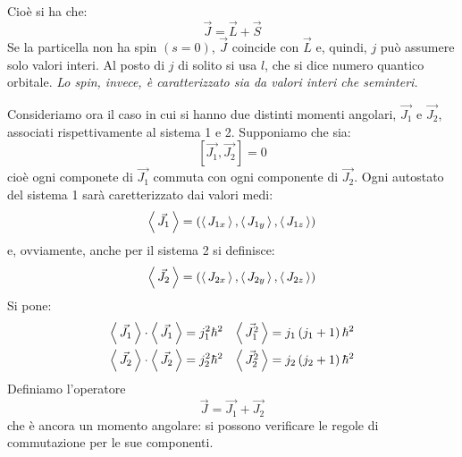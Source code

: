 Cioè si ha che: 
\begin{equation}
\vec{J} = \vec{L} + \vec{S}
\end{equation}
Se la particella non ha spin $\left( s = 0\right)$, $\vec{J}$ coincide con
$\vec{L}$ e, quindi, $j$ può assumere solo valori interi. Al posto di $j$ di
solito si usa $l$, che si dice numero quantico orbitale. \textit{Lo spin,
invece, è caratterizzato sia da valori interi che seminteri.}

Consideriamo ora il caso in cui si hanno due distinti momenti angolari,
$\vec{J_{1}}$ e $\vec{J_{2}}$, associati rispettivamente al sistema 1 e 2.
Supponiamo che sia:
\begin{equation}
\left[\vec{J_{1}}, \vec{J_{2}} \right] = 0
\end{equation}
cioè ogni componete di $\vec{J_{1}}$ commuta con ogni componente di
$\vec{J_{2}}$. Ogni autostato del sistema 1 sarà caretterizzato dai valori medi:
\begin{equation}
\left\langle\, \vec{J_{1}} \,\right\rangle = \left( \left\langle\, J_{1x} \,\right\rangle, \left\langle\, J_{1y} \,\right\rangle, \left\langle\, J_{1z} \,\right\rangle \right)
\end{equation}
e, ovviamente, anche per il sistema 2 si definisce:
\begin{equation}
\left\langle\, \vec{J_{2}} \,\right\rangle = \left( \left\langle\, J_{2x} \,\right\rangle, \left\langle\, J_{2y} \,\right\rangle, \left\langle\, J_{2z} \,\right\rangle \right)
\end{equation}
Si pone:
\begin{align}
\left\langle\, \vec{J_{1}} \,\right\rangle \cdot \left\langle\, \vec{J_{1}} \,\right\rangle &= j_{1}^{2}\hbar ^2 & \left\langle\, \vec{J_{1}^{2}} \,\right\rangle &= j_{1}\left(j_{1} +1\right)\hbar ^{2} \\
\left\langle\, \vec{J_{2}} \,\right\rangle \cdot \left\langle\, \vec{J_{2}} \,\right\rangle &= j_{2}^{2}\hbar ^2 & \left\langle\, \vec{J_{2}^{2}} \,\right\rangle &= j_{2}\left(j_{2} +1\right)\hbar ^{2} \\  
\end{align}
Definiamo l'operatore 
\begin{equation}
\vec{J} = \vec{J_{1}} + \vec{J_{2}}
\end{equation}
che è ancora un momento angolare: si possono verificare le regole di
commutazione per le sue componenti.

